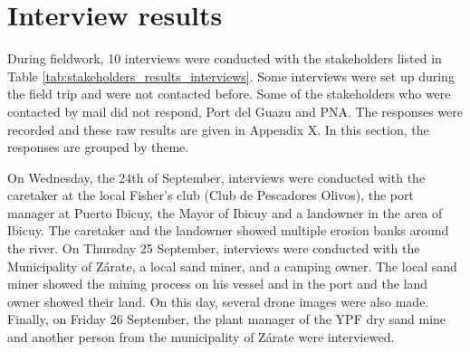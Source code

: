\section{Interview results}

During fieldwork, 10 interviews were conducted with the stakeholders listed in Table \ref{tab:stakeholders_results_interviews}. Some interviews were set up during the field trip and were not contacted before. Some of the stakeholders who were contacted by mail did not respond, Port del Guazu and PNA. The responses were recorded and these raw results are given in Appendix X. In this section, the responses are grouped by theme.

On Wednesday, the 24th of September, interviews were conducted with the caretaker at the local Fisher's club (Club de Pescadores Olivos), the port manager at Puerto Ibicuy, the Mayor of Ibicuy and a landowner in the area of Ibicuy. The caretaker and the landowner showed multiple erosion banks around the river. On Thursday 25 September, interviews were conducted with the Municipality of Zárate, a local sand miner, and a camping owner. The local sand miner showed the mining process on his vessel and in the port and the land owner showed their land. On this day, several drone images were also made. Finally, on Friday 26 September, the plant manager of the YPF dry sand mine and another person from the municipality of Zárate were interviewed. 

